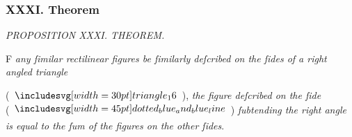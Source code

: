 \documentclass[11pt,preview]{standalone}
\begin{document}
\subsubsection{XXXI. Theorem}

\begin{minipage}[t]{0.54\textwidth}
    \begin{center}
        \textit{PROPOSITION XXXI. THEOREM.}\label{book6pr31} \\
    \end{center}

    \hfill

    \begin{center}
        \raggedright \lettrine[lines=3, loversize=1, nindent=0pt]{}{}F \textit{any ſimilar rectilinear figures be ſimilarly deſcribed on the ſides of a right angled triangle}
    \end{center}
    \raggedright (\hspace{-1ex}$\img[0][0][30]{triangle_16}$\hspace{-1ex}), \textit{the figure deſcribed on the ſide}\\ (\hspace{-1ex}$\bimg{dotted_blue_and_blue_line}$\hspace{-1ex}) \textit{ſubtending the right angle is equal to the ſum of the figures on the other ſides}.
\end{minipage}%
\hfill
\begin{minipage}[t]{0.43\textwidth}
    \vspace{20pt}
    
\end{minipage}

\hfill

\hfill
\end{document}
